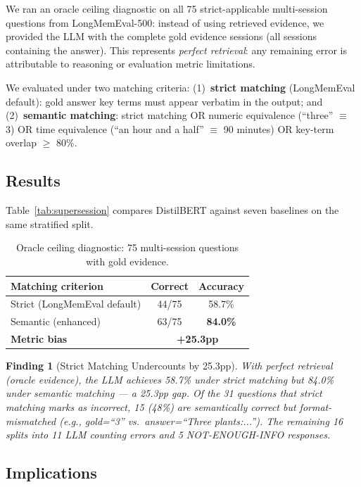 \documentclass{article}
\newtheorem{finding}{Finding}
\begin{document}
We ran an oracle ceiling diagnostic on all 75 strict-applicable multi-session questions from LongMemEval-500: instead of using retrieved evidence, we provided the LLM with the complete gold evidence sessions (all sessions containing the answer). This represents \emph{perfect retrieval}: any remaining error is attributable to reasoning or evaluation metric limitations.

We evaluated under two matching criteria: (1)~\textbf{strict matching} (LongMemEval default): gold answer key terms must appear verbatim in the output; and (2)~\textbf{semantic matching}: strict matching OR numeric equivalence (``three'' $\equiv$ 3) OR time equivalence (``an hour and a half'' $\equiv$ 90 minutes) OR key-term overlap $\geq$ 80\%.

\subsection{Results}

Table~\ref{tab:supersession} compares DistilBERT against seven baselines on the same stratified split.

\begin{table}[h]
\centering
\caption{Oracle ceiling diagnostic: 75 multi-session questions with gold evidence.}
\begin{tabular}{lcc}
\toprule
Matching criterion & Correct & Accuracy \\
\midrule
Strict (LongMemEval default) & 44/75 & 58.7\% \\
Semantic (enhanced) & 63/75 & \textbf{84.0\%} \\
\midrule
\textbf{Metric bias} & \multicolumn{2}{c}{\textbf{+25.3pp}} \\
\bottomrule
\end{tabular}
\end{table}

\begin{finding}[Strict Matching Undercounts by 25.3pp]
With perfect retrieval (oracle evidence), the LLM achieves 58.7\% under strict matching but 84.0\% under semantic matching --- a 25.3pp gap. Of the 31 questions that strict matching marks as incorrect, 15 (48\%) are semantically correct but format-mismatched (e.g., gold=``3'' vs.\ answer=``Three plants:...''). The remaining 16 splits into 11 LLM counting errors and 5 NOT-ENOUGH-INFO responses.
\end{finding}

\subsection{Implications}
\end{document}
